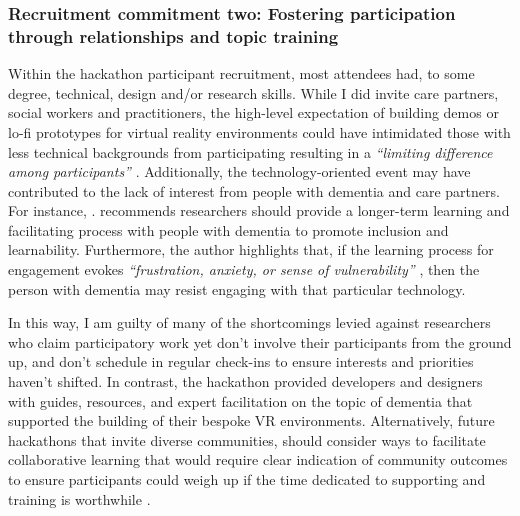 \subsubsection{Recruitment commitment two: Fostering participation through relationships and topic training}
\label{DiscussionTwo:CommitTwo}
Within the hackathon participant recruitment, most attendees had, to some degree, technical, design and/or research skills. While I did invite care partners, social workers and practitioners, the high-level expectation of building demos or lo-fi prototypes for virtual reality environments could have intimidated those with less technical backgrounds from participating resulting in a \textit{``limiting difference among participants''} \citep{irani_hackathons_2015}. Additionally, the technology-oriented event may have contributed to the lack of interest from people with dementia and care partners. For instance, \cite{hwang2020exploring}. recommends researchers should provide a longer-term learning and facilitating process with people with dementia to promote inclusion and learnability. Furthermore, the author highlights that, if the learning process for engagement evokes \textit{``frustration, anxiety, or sense of vulnerability''} \citep[pg.46:26]{hwang2020exploring}, then the person with dementia may resist engaging with that particular technology. 

In this way, I am guilty of many of the shortcomings levied against researchers who claim participatory work yet don’t involve their participants from the ground up, and don’t schedule in regular check-ins to ensure interests and priorities haven’t shifted. In contrast, the hackathon provided developers and designers with guides, resources, and expert facilitation on the topic of dementia that supported the building of their bespoke VR environments. Alternatively, future hackathons that invite diverse communities, should consider ways to facilitate collaborative learning that would require clear indication of community outcomes to ensure participants could weigh up if the time dedicated to supporting and training is worthwhile \citep{hayes2020inclusive}.

